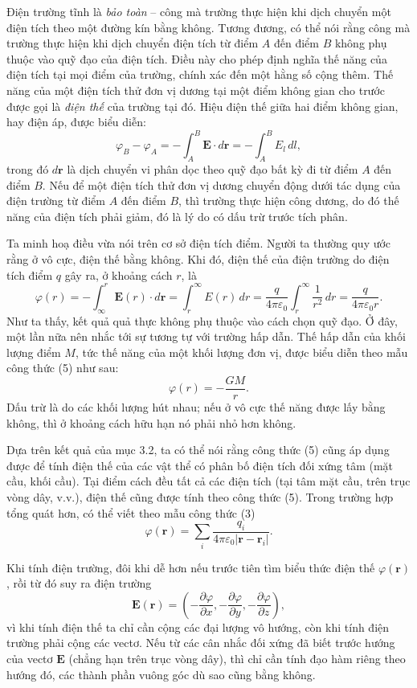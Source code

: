 Điện trường tĩnh là \emph{bảo toàn} -- công mà trường thực hiện khi dịch chuyển một điện tích theo một đường kín bằng không. Tương đương, có thể nói rằng công mà trường thực hiện khi dịch chuyển điện tích từ điểm $A$ đến điểm $B$ không phụ thuộc vào quỹ đạo của điện tích. Điều này cho phép định nghĩa thế năng của điện tích tại mọi điểm của trường, chính xác đến một hằng số cộng thêm. Thế năng của một điện tích thử đơn vị dương tại một điểm không gian cho trước được gọi là \emph{điện thế} của trường tại đó. Hiệu điện thế giữa hai điểm không gian, hay điện áp, được biểu diễn:
\[
\varphi_B - \varphi_A = -\int_A^B \mathbf{E}\cdot d\mathbf{r} = -\int_A^B E_l\,dl,
\]
trong đó $d\mathbf{r}$ là dịch chuyển vi phân dọc theo quỹ đạo bất kỳ đi từ điểm $A$ đến điểm $B$. Nếu để một điện tích thử đơn vị dương chuyển động dưới tác dụng của điện trường từ điểm $A$ đến điểm $B$, thì trường thực hiện công dương, do đó thế năng của điện tích phải giảm, đó là lý do có dấu trừ trước tích phân.

Ta minh hoạ điều vừa nói trên cơ sở điện tích điểm. Người ta thường quy ước rằng ở vô cực, điện thế bằng không. Khi đó, điện thế của điện trường do điện tích điểm $q$ gây ra, ở khoảng cách $r$, là
\[
\varphi(r) = -\int_\infty^r \mathbf{E}(r)\cdot d\mathbf{r} = \int_r^\infty E(r)\,dr = \frac{q}{4\pi\varepsilon_0}\int_r^\infty \frac{1}{r^2}\,dr = \frac{q}{4\pi\varepsilon_0 r}. \tag{5}
\]
Như ta thấy, kết quả quả thực không phụ thuộc vào cách chọn quỹ đạo. Ở đây, một lần nữa nên nhắc tới sự tương tự với trường hấp dẫn. Thế hấp dẫn của khối lượng điểm $M$, tức thế năng của một khối lượng đơn vị, được biểu diễn theo mẫu công thức (5) như sau:
\[
\varphi(r) = -\frac{GM}{r}.
\]
Dấu trừ là do các khối lượng hút nhau; nếu ở vô cực thế năng được lấy bằng không, thì ở khoảng cách hữu hạn nó phải nhỏ hơn không.

Dựa trên kết quả của mục 3.2, ta có thể nói rằng công thức (5) cũng áp dụng được để tính điện thế của các vật thể có phân bố điện tích đối xứng tâm (mặt cầu, khối cầu). Tại điểm cách đều tất cả các điện tích (tại tâm mặt cầu, trên trục vòng dây, v.v.), điện thế cũng được tính theo công thức (5). Trong trường hợp tổng quát hơn, có thể viết theo mẫu công thức (3)
\[
\varphi(\mathbf{r}) = \sum_i \frac{q_i}{4\pi\varepsilon_0|\mathbf{r}-\mathbf{r}_i|}.
\]

Khi tính điện trường, đôi khi dễ hơn nếu trước tiên tìm biểu thức điện thế $\varphi(\mathbf{r})$, rồi từ đó suy ra điện trường
\[
\mathbf{E}(\mathbf{r}) = \left(-\frac{\partial\varphi}{\partial x}, -\frac{\partial\varphi}{\partial y}, -\frac{\partial\varphi}{\partial z}\right),
\]
vì khi tính điện thế ta chỉ cần cộng các đại lượng vô hướng, còn khi tính điện trường phải cộng các vectơ. Nếu từ các cân nhắc đối xứng đã biết trước hướng của vectơ $\mathbf{E}$ (chẳng hạn trên trục vòng dây), thì chỉ cần tính đạo hàm riêng theo hướng đó, các thành phần vuông góc dù sao cũng bằng không.


